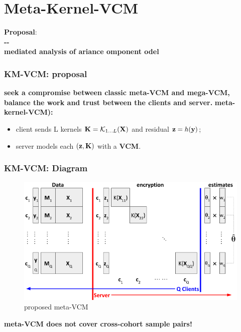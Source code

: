 \documentclass{beamer}
\begin{document}
\section{Meta-Kernel-VCM}
\begin{frame}
  \large{\textbf{Proposal}}: \\
  \huge{\textbf{--}} \\
  \large{\textbf{ mediated  analysis of
      ariance omponent odel}}
\end{frame}
\begin{frame}\frametitle{KM-VCM: proposal}
  \textbf{seek a compromise between classic meta-VCM and mega-VCM,
    balance the work and trust between the clients and server.}
  \textbf{meta-kernel-VCM):}
  \begin{itemize}
  \item client sends L kernels $\mathbf{K} = \mathcal{K}_{1 \dots L}(\mathbf{X})$
    and residual $\mathbf{z}=h(\mathbf{y})$;
  \item server models each $(\mathbf{z}, \mathbf{K})$ with a \textbf{VCM}.
  \end{itemize}
\end{frame}
\begin{frame}\frametitle{KM-VCM: Diagram}
  \begin{figure}
    \centering \includegraphics[width=\textwidth]{img/meta1}
    \caption{proposed meta-VCM}
    \label{fig:mata1}
  \end{figure}
  \textbf{meta-VCM does not cover cross-cohort sample pairs!}
\end{frame}
\end{document}
